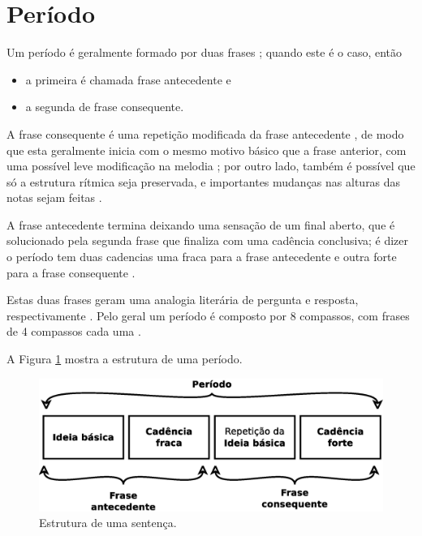 \section{Período}
\label{sec:Periodo}



Um período é geralmente formado por duas frases \cite[pp. 350]{duckworth2007creative} \cite[pp. 336]{medteoria};
quando este é o caso, então
\begin{itemize}  
\item a primeira é chamada frase antecedente e 
\item a segunda de frase consequente.
\end{itemize}

A frase consequente é uma repetição modificada da frase antecedente 
\cite[pp. 53,55]{schoenberg1990fundamentos} \cite[pp. 25,29]{schoenberg1967fundamentals},
de modo que esta geralmente inicia com o mesmo motivo básico que a frase anterior,
com uma possível leve modificação na melodia
\cite[pp. 51]{schoenberg1990fundamentos} \cite[pp. 25]{schoenberg1967fundamentals};
por outro lado, também é possível que só a estrutura rítmica seja preservada,
e importantes mudanças nas alturas das notas sejam feitas
\cite[pp. 57]{schoenberg1990fundamentos} \cite[pp. 30]{schoenberg1967fundamentals}.


A frase antecedente termina deixando uma sensação de um final aberto, 
que é solucionado pela segunda frase que finaliza com uma cadência conclusiva;
é dizer o período tem duas cadencias uma fraca para a frase antecedente e 
outra forte para a frase consequente 
\cite[pp. 350]{duckworth2007creative} \cite[pp. 336]{medteoria} \cite[pp. 1176]{latham2008diccionario}
\cite[pp. 25,29]{schoenberg1967fundamentals}.

Estas duas frases geram uma analogia literária de pergunta e resposta, respectivamente \cite[pp. 336]{medteoria}.
Pelo geral um período é composto por 8 compassos, com frases de 4 compassos cada uma \cite[pp. 25]{schoenberg1967fundamentals}.

A Figura \ref{fig:periodostruct} mostra a estrutura de uma período. 
\begin{figure}[!h]
  \centering
    \includegraphics[width=\textwidth]{chapters/cap-musica-composer/periodo.eps}
\caption{Estrutura de uma sentença.}
\label{fig:periodostruct}
\end{figure}


